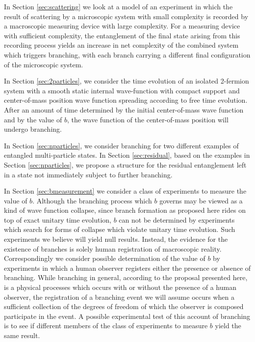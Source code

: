 \documentclass[12pt,amsmath,amssymb,onecolumn]{revtex4-2}
\begin{document}
In Section \ref{sec:scattering} we look at
a model of an experiment in which the result of scattering by a microscopic system 
with small complexity
is recorded by a macroscopic measuring device with large complexity.
For a measuring device with sufficient complexity, the entanglement 
of the final state arising from this recording process yields
an increase in net complexity of the combined system which 
triggers branching, with each branch carrying a different final configuration
of the microscopic system.

In Section \ref{sec:2particles}, we consider
the time evolution of an isolated 2-fermion system with
a smooth static internal wave-function with compact support and
center-of-mass position wave function spreading according to free time evolution.
After an amount of time determined by the initial center-of-mass wave function
and by the value of $b$,
the wave function of the center-of-mass position will undergo branching. 

In Section \ref{sec:nparticles},
we consider branching 
for two different examples of entangled multi-particle states.
In Section \ref{sec:residual},
based on the examples in Section \ref{sec:nparticles}, we propose
a structure for the residual
entanglement left in a state not immediately subject to further branching.

In Section \ref{sec:bmeasurement} we consider
a class of experiments to measure the value of $b$.
Although the branching
process which $b$ governs may be viewed as a kind of wave function
collapse, since branch formation as proposed here rides on top of exact
unitary time evolution, $b$ can not be determined by
experiments which search for forms of collapse which violate
unitary time evolution.
Such experiments we believe will yield null results.
Instead, the evidence for the existence of branches is
solely human registration of macroscopic reality.
Correspondingly we consider possible
determination of the value of $b$
by experiments
in which
a human observer registers 
either the presence or absence of branching.
While
branching in general, according to the proposal
presented here, is a physical processes which
occurs with or without the presence of a human
observer,
the registration of a branching
event we will assume occurs when a
sufficient collection of
the degrees of freedom of which
the observer is composed
participate in the event.
A possible experimental test of this account of branching
is to see if different
members of the class of experiments to measure $b$
yield the same result.
\end{document}
